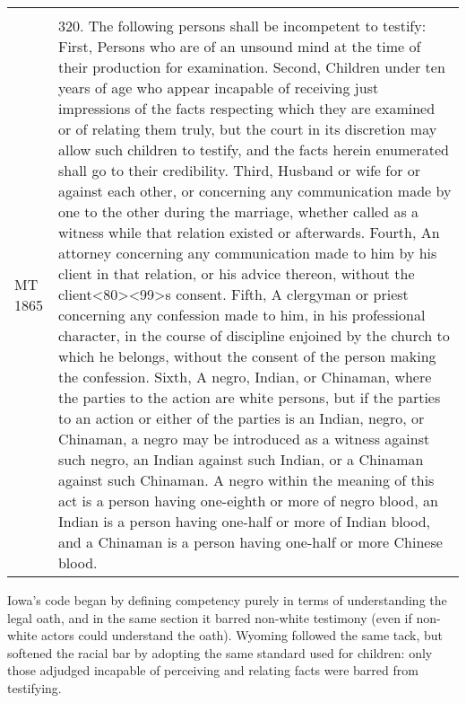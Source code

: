 \documentclass[12pt,]{article}
\begin{document}
\begin{longtable}[]{@{}ll@{}}
\begin{minipage}[t]{0.74\columnwidth}
\end{minipage}\tabularnewline
\begin{minipage}[t]{0.20\columnwidth}\raggedright
MT 1865\strut
\end{minipage} & \begin{minipage}[t]{0.74\columnwidth}\raggedright
320. The following persons shall be incompetent to testify: First,
Persons who are of an unsound mind at the time of their production for
examination. Second, Children under ten years of age who appear
incapable of receiving just impressions of the facts respecting which
they are examined or of relating them truly, but the court in its
discretion may allow such children to testify, and the facts herein
enumerated shall go to their credibility. Third, Husband or wife for or
against each other, or concerning any communication made by one to the
other during the marriage, whether called as a witness while that
relation existed or afterwards. Fourth, An attorney concerning any
communication made to him by his client in that relation, or his advice
thereon, without the
client\textless80\textgreater\textless99\textgreater s consent. Fifth, A
clergyman or priest concerning any confession made to him, in his
professional character, in the course of discipline enjoined by the
church to which he belongs, without the consent of the person making the
confession. Sixth, A negro, Indian, or Chinaman, where the parties to
the action are white persons, but if the parties to an action or either
of the parties is an Indian, negro, or Chinaman, a negro may be
introduced as a witness against such negro, an Indian against such
Indian, or a Chinaman against such Chinaman. A negro within the meaning
of this act is a person having one-eighth or more of negro blood, an
Indian is a person having one-half or more of Indian blood, and a
Chinaman is a person having one-half or more Chinese blood.\strut
\end{minipage}\tabularnewline
\bottomrule
\end{longtable}

Iowa's code began by defining competency purely in terms of
understanding the legal oath, and in the same section it barred
non-white testimony (even if non-white actors could understand the
oath). Wyoming followed the same tack, but softened the racial bar by
adopting the same standard used for children: only those adjudged
incapable of perceiving and relating facts were barred from testifying.
\end{document}
